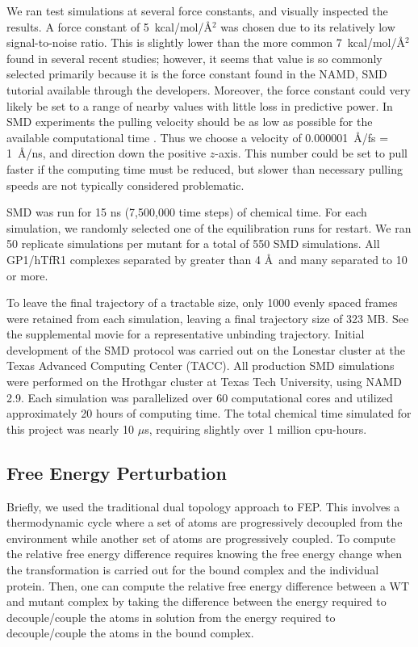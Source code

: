 \documentclass[12pt]{article}
\begin{document}
We ran test simulations at several force constants, and visually inspected the results. A force constant of 5~kcal/mol/\AA$^2$ was chosen due to its relatively low signal-to-noise ratio. This is slightly lower than the more common 7~kcal/mol/\AA$^2$ found in several recent studies; however, it seems that value is so commonly selected primarily because it is the force constant found in the NAMD, SMD tutorial available through the developers. Moreover, the force constant could very likely be set to a range of nearby values with little loss in predictive power. In SMD experiments the pulling velocity should be as low as possible for the available computational time \citet{Cuendet2008,Cuendet2011}. Thus we choose a velocity of 0.000001~\AA/fs = 1~\AA/ns, and direction down the positive $z$-axis. This number could be set to pull faster if the computing time must be reduced, but slower than necessary pulling speeds are not typically considered problematic. 

SMD was run for 15 ns (7,500,000 time steps) of chemical time. For each simulation, we randomly selected one of the equilibration runs for restart. We ran 50 replicate simulations per mutant for a total of 550 SMD simulations. All GP1/hTfR1 complexes separated by greater than 4 \AA\ and many separated to 10 or more.

To leave the final trajectory of a tractable size, only 1000 evenly spaced frames were retained from each simulation, leaving a final trajectory size of 323 MB. See the supplemental movie for a representative unbinding trajectory. Initial development of the SMD protocol was carried out on the Lonestar cluster at the Texas Advanced Computing Center (TACC). All production SMD simulations were performed on the Hrothgar cluster at Texas Tech University, using NAMD 2.9. Each simulation was parallelized over 60 computational cores and utilized approximately 20 hours of computing time. The total chemical time simulated for this project was nearly 10 $\mu$s, requiring slightly over 1 million cpu-hours.

\subsection{Free Energy Perturbation}

Briefly, we used the traditional dual topology approach to FEP. This involves a thermodynamic cycle where a set of atoms are progressively decoupled from the environment while another set of atoms are progressively coupled. To compute the relative free energy difference requires knowing the free energy change when the transformation is carried out for the bound complex and the individual protein. Then, one can compute the relative free energy difference between a WT and mutant complex by taking the difference between the energy required to decouple/couple the atoms in solution from the energy required to decouple/couple the atoms in the bound complex.
\end{document}
